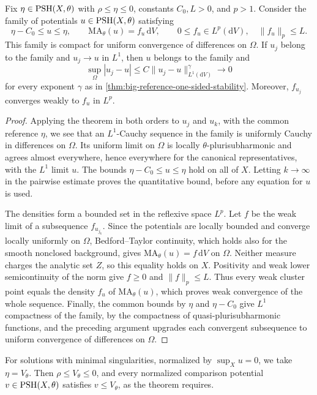 \begin{corollary}\label{cor:big-reference-uniform-convergence}
Fix $\eta\in\mathrm{PSH}(X,\theta)$ with $\rho\leq\eta\leq0$, constants $C_0,L>0$, and $p>1$. Consider the family of potentials $u\in\mathrm{PSH}(X,\theta)$ satisfying
\[
 \eta-C_0\leq u\leq\eta,\qquad
 \mathrm{MA}_\theta(u)=f_u\,\mathrm{d}V,\qquad0\leq f_u\in L^p(\mathrm{d}V),
 \quad\|f_u\|_p\leq L.
\]
This family is compact for uniform convergence of differences on $\Omega$. If $u_j$ belong to the family and $u_j\to u$ in $L^1$, then $u$ belongs to the family and
\[
 \sup_\Omega|u_j-u|\leq C\|u_j-u\|_{L^1(\mathrm{d}V)}^\gamma
 \longrightarrow0
\]
for every exponent $\gamma$ as in \cref{thm:big-reference-one-sided-stability}. Moreover, $f_{u_j}$ converges weakly to $f_u$ in $L^p$.
\end{corollary}
\begin{proof}
Applying the theorem in both orders to $u_j$ and $u_k$, with the common reference $\eta$, we see that an $L^1$-Cauchy sequence in the family is uniformly Cauchy in differences on $\Omega$. Its uniform limit on $\Omega$ is locally $\theta$-plurisubharmonic and agrees almost everywhere, hence everywhere for the canonical representatives, with the $L^1$ limit $u$. The bounds $\eta-C_0\leq u\leq\eta$ hold on all of $X$. Letting $k\to\infty$ in the pairwise estimate proves the quantitative bound, before any equation for $u$ is used.

The densities form a bounded set in the reflexive space $L^p$. Let $f$ be the weak limit of a subsequence $f_{u_{j_k}}$. Since the potentials are locally bounded and converge locally uniformly on $\Omega$, Bedford--Taylor continuity, which holds also for the smooth nonclosed background, gives $\mathrm{MA}_\theta(u)=f\,\mathrm{d}V$ on $\Omega$. Neither measure charges the analytic set $Z$, so this equality holds on $X$. Positivity and weak lower semicontinuity of the norm give $f\geq0$ and $\|f\|_p\leq L$. Thus every weak cluster point equals the density $f_u$ of $\mathrm{MA}_\theta(u)$, which proves weak convergence of the whole sequence. Finally, the common bounds by $\eta$ and $\eta-C_0$ give $L^1$ compactness of the family, by the compactness of quasi-plurisubharmonic functions, and the preceding argument upgrades each convergent subsequence to uniform convergence of differences on $\Omega$.
\end{proof}

For solutions with minimal singularities, normalized by $\sup_Xu=0$, we take $\eta=V_\theta$. Then $\rho\leq V_\theta\leq0$, and every normalized comparison potential $v\in\mathrm{PSH}(X,\theta)$ satisfies $v\leq V_\theta$, as the theorem requires.
